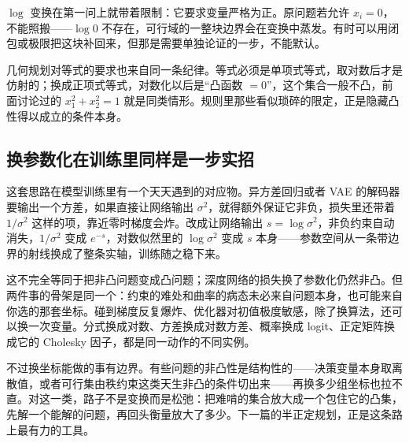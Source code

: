 \(\log\) 变换在第一问上就带着限制：它要求变量严格为正。原问题若允许 \(x_i=0\)，不能照搬——\(\log0\) 不存在，可行域的一整块边界会在变换中蒸发。有时可以用闭包或极限把这块补回来，但那是需要单独论证的一步，不能默认。

几何规划对等式的要求也来自同一条纪律。等式必须是单项式等式，取对数后才是仿射的；换成正项式等式，对数化以后是``凸函数 \(=0\)''，这个集合一般不凸，前面讨论过的 \(x_1^2+x_2^2=1\) 就是同类情形。规则里那些看似琐碎的限定，正是隐藏凸性得以成立的条件本身。

\subsection{换参数化在训练里同样是一步实招}

这套思路在模型训练里有一个天天遇到的对应物。异方差回归或者 VAE 的解码器要输出一个方差，如果直接让网络输出 \(\sigma^2\)，就得额外保证它非负，损失里还带着 \(1/\sigma^2\) 这样的项，靠近零时梯度会炸。改成让网络输出 \(s=\log\sigma^2\)，非负约束自动消失，\(1/\sigma^2\) 变成 \(e^{-s}\)，对数似然里的 \(\log\sigma^2\) 变成 \(s\) 本身——参数空间从一条带边界的射线换成了整条实轴，训练随之稳下来。

这不完全等同于把非凸问题变成凸问题；深度网络的损失换了参数化仍然非凸。但两件事的骨架是同一个：约束的难处和曲率的病态未必来自问题本身，也可能来自你选的那套坐标。碰到梯度反复爆炸、优化器对初值极度敏感，除了换算法，还可以换一次变量。分式换成对数、方差换成对数方差、概率换成 logit、正定矩阵换成它的 Cholesky 因子，都是同一动作的不同实例。

不过换坐标能做的事有边界。有些问题的非凸性是结构性的——决策变量本身取离散值，或者可行集由秩约束这类天生非凸的条件切出来——再换多少组坐标也拉不直。对这一类，路子不是变换而是松弛：把难啃的集合放大成一个包住它的凸集，先解一个能解的问题，再回头衡量放大了多少。下一篇的半正定规划，正是这条路上最有力的工具。

